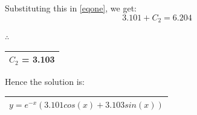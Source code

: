 \documentclass{article}
\begin{document}
Substituting this in \eqref{eqone}, we get:\\
\[3.101 + C_2 = 6.204\]
\begin{center}
$\therefore$
\begin{tabular}{|c|}
\hline
$C_2$ = 3.103\\
\hline
\end{tabular}
\end{center}
Hence the solution is:\\
\begin{center}
\begin{tabular}{|c|}
\hline
$y=e^{-x}(3.101 cos(x) + 3.103 sin(x))$\\
\hline
\end{tabular}
\end{center}
\end{document}
